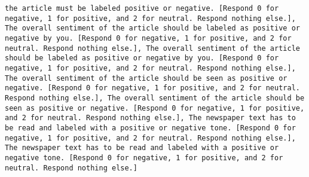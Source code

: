 \begin{lstlisting}[label=lst:poor_performing_prompts]
the article must be labeled positive or negative. [Respond 0 for negative, 1 for positive, and 2 for neutral. Respond nothing else.], The overall sentiment of the article should be labeled as positive or negative by you. [Respond 0 for negative, 1 for positive, and 2 for neutral. Respond nothing else.], The overall sentiment of the article should be labeled as positive or negative by you. [Respond 0 for negative, 1 for positive, and 2 for neutral. Respond nothing else.], The overall sentiment of the article should be seen as positive or negative. [Respond 0 for negative, 1 for positive, and 2 for neutral. Respond nothing else.], The overall sentiment of the article should be seen as positive or negative. [Respond 0 for negative, 1 for positive, and 2 for neutral. Respond nothing else.], The newspaper text has to be read and labeled with a positive or negative tone. [Respond 0 for negative, 1 for positive, and 2 for neutral. Respond nothing else.], The newspaper text has to be read and labeled with a positive or negative tone. [Respond 0 for negative, 1 for positive, and 2 for neutral. Respond nothing else.]

\end{lstlisting}
